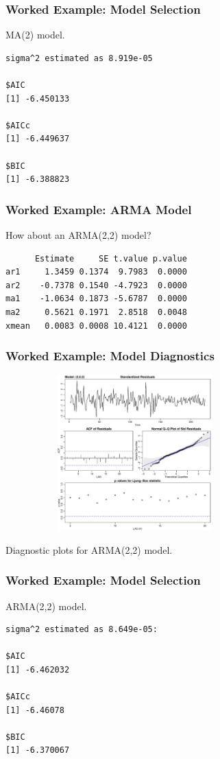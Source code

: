 \documentclass[%
xcolor=pdftex]{beamer}
\begin{document}
\begin{frame}[fragile]
\frametitle{Worked Example: Model Selection}

MA(2) model.

\begin{verbatim}
sigma^2 estimated as 8.919e-05

$AIC
[1] -6.450133

$AICc
[1] -6.449637

$BIC
[1] -6.388823
\end{verbatim}

\end{frame}

\begin{frame}[fragile]
\frametitle{Worked Example: ARMA Model}

How about an ARMA(2,2) model?

\begin{verbatim}
      Estimate     SE t.value p.value
ar1     1.3459 0.1374  9.7983  0.0000
ar2    -0.7378 0.1540 -4.7923  0.0000
ma1    -1.0634 0.1873 -5.6787  0.0000
ma2     0.5621 0.1971  2.8518  0.0048
xmean   0.0083 0.0008 10.4121  0.0000
\end{verbatim}

\end{frame}

\begin{frame}
\frametitle{Worked Example: Model Diagnostics}

\includegraphics[width=100mm, height=60mm]{arma_diag.pdf}

Diagnostic plots for ARMA(2,2) model.

\end{frame}

\begin{frame}[fragile]
\frametitle{Worked Example: Model Selection}

ARMA(2,2) model.

\begin{verbatim}
sigma^2 estimated as 8.649e-05:

$AIC
[1] -6.462032

$AICc
[1] -6.46078

$BIC
[1] -6.370067

\end{verbatim}

\end{frame}
\end{document}
